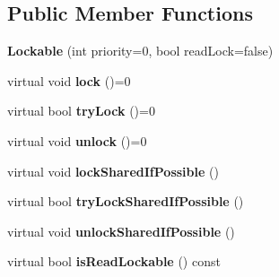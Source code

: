 \subsection*{Public Member Functions}
\begin{DoxyCompactItemize}
\item 
\hypertarget{classcore_1_1threading_1_1_lockable_a8d45d53deea8bbda7748ce15c4aabdd1}{{\bfseries Lockable} (int priority=0, bool read\-Lock=false)}\label{classcore_1_1threading_1_1_lockable_a8d45d53deea8bbda7748ce15c4aabdd1}

\item 
\hypertarget{classcore_1_1threading_1_1_lockable_a98ec4e38056bb634961b45e159dd7068}{virtual void {\bfseries lock} ()=0}\label{classcore_1_1threading_1_1_lockable_a98ec4e38056bb634961b45e159dd7068}

\item 
\hypertarget{classcore_1_1threading_1_1_lockable_a7da90cecb5680fa5575b6dc415919740}{virtual bool {\bfseries try\-Lock} ()=0}\label{classcore_1_1threading_1_1_lockable_a7da90cecb5680fa5575b6dc415919740}

\item 
\hypertarget{classcore_1_1threading_1_1_lockable_a344cac44e798886eaccdb0f276a5ebf9}{virtual void {\bfseries unlock} ()=0}\label{classcore_1_1threading_1_1_lockable_a344cac44e798886eaccdb0f276a5ebf9}

\item 
\hypertarget{classcore_1_1threading_1_1_lockable_aa87f2d65702ed4866c844cf27a91a190}{virtual void {\bfseries lock\-Shared\-If\-Possible} ()}\label{classcore_1_1threading_1_1_lockable_aa87f2d65702ed4866c844cf27a91a190}

\item 
\hypertarget{classcore_1_1threading_1_1_lockable_a138d8875e6003cf6492f845fb79b0137}{virtual bool {\bfseries try\-Lock\-Shared\-If\-Possible} ()}\label{classcore_1_1threading_1_1_lockable_a138d8875e6003cf6492f845fb79b0137}

\item 
\hypertarget{classcore_1_1threading_1_1_lockable_a8cbde0c6ad2cdb1f109530d7d3acba22}{virtual void {\bfseries unlock\-Shared\-If\-Possible} ()}\label{classcore_1_1threading_1_1_lockable_a8cbde0c6ad2cdb1f109530d7d3acba22}

\item 
\hypertarget{classcore_1_1threading_1_1_lockable_a1212e53abe74b938c199d4357ea2a8c8}{virtual bool {\bfseries is\-Read\-Lockable} () const }\label{classcore_1_1threading_1_1_lockable_a1212e53abe74b938c199d4357ea2a8c8}


\end{DoxyCompactItemize}
